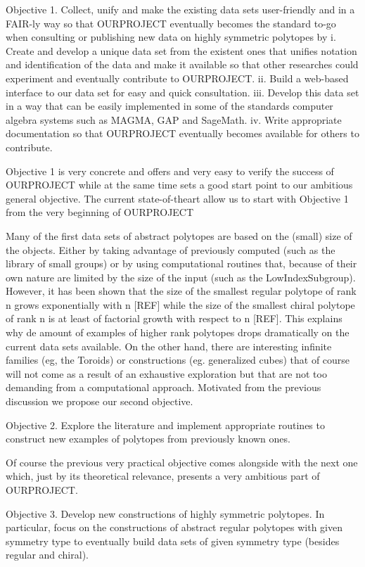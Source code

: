 Objective 1. Collect, unify and make the existing data sets user-friendly and in a FAIR-ly way so that OURPROJECT eventually becomes the standard to-go when consulting or publishing new data on highly symmetric polytopes by
    i. Create and develop a unique data set from the existent ones that unifies notation and identification of the data and make it available so that other researches could experiment and eventually contribute to OURPROJECT.
    ii. Build a web-based interface to our data set for easy and quick consultation.
    iii. Develop this data set in a way that can be easily implemented in some of the standards computer algebra systems such as MAGMA, GAP and SageMath.
    iv. Write appropriate documentation so that OURPROJECT eventually becomes available for others to contribute.

Objective 1 is very concrete and offers and very easy to verify the success of OURPROJECT while at the same time sets a good start point to our ambitious general objective. The current state-of-theart allow us to start with Objective 1 from the very beginning of OURPROJECT

	Many of the first data sets of abstract polytopes are based on the (small) size of the objects. Either by taking advantage of previously computed (such as the library of small groups) or by using computational routines that, because of their own nature are limited by the size of the input (such as the LowIndexSubgroup). However, it has been shown that the size of the smallest regular polytope of rank n grows exponentially with n [REF] while the size of the smallest chiral polytope of rank n is at least of factorial growth with respect to n [REF]. This explains why de amount of examples of higher rank polytopes drops dramatically on the current data sets available.
On the other hand, there are interesting infinite families (eg, the Toroids) or constructions (eg. generalized cubes) that of course will not come as a result of an exhaustive exploration but that are not too demanding from a computational approach. Motivated from the previous discussion we propose our second objective.

Objective 2. Explore the literature and implement appropriate routines to construct new examples of polytopes from previously known ones.

Of course the previous very practical objective comes alongside with the next one which, just by its theoretical relevance, presents a very ambitious part of OURPROJECT.

Objective 3. Develop new constructions of highly symmetric polytopes. In particular, focus on the constructions of abstract regular polytopes with given symmetry type to eventually build data sets of given symmetry type (besides regular and chiral).

